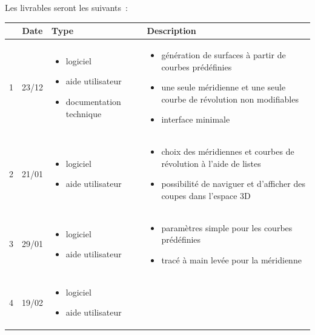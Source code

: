 \documentclass{scrartcl}
\begin{document}
		Les livrables seront les suivants~:\\
		\begin{tabular}{|c|c|p{4cm}|p{7.5cm}|} %
			\hline
			\textbf{\No} & \textbf{Date} & \textbf{Type}&\textbf{Description} \\
			\hline
			1 & 23/12 & 
			\begin{itemize}
				\item logiciel
				\item aide utilisateur
				\item documentation technique
			\end{itemize}& 
			\begin{itemize}
				\item génération de surfaces à partir de courbes prédéfinies
				\item une seule méridienne et une seule courbe de révolution non modifiables
				\item interface minimale
			\end{itemize} \\
			\hline
			2 & 21/01& 
			\begin{itemize}
				\item logiciel
				\item aide utilisateur
			\end{itemize}& 
			\begin{itemize}
				\item choix des méridiennes et courbes de révolution à l'aide de listes
				\item possibilité de naviguer et d'afficher des coupes dans l'espace 3D
			\end{itemize} \\
			\hline
			3 & 29/01 &
			\begin{itemize}
				\item logiciel
				\item aide utilisateur
			\end{itemize}& 
			\begin{itemize}
				\item paramètres simple pour les courbes prédéfinies
				\item tracé à main levée pour la méridienne
			\end{itemize} \\
			\hline
			4 & 19/02 &
			\begin{itemize}
				\item logiciel
				\item aide utilisateur

\end{itemize}
\end{tabular}
\end{document}
